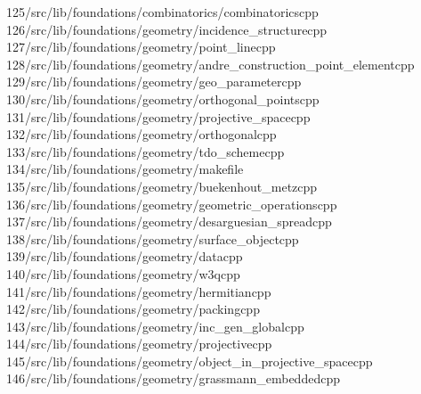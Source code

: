 \begin{tabbing}
125\>/src/lib/foundations/combinatorics/combinatoricscpp\\[0pt]
126\>/src/lib/foundations/geometry/incidence\_structurecpp\\[0pt]
127\>/src/lib/foundations/geometry/point\_linecpp\\[0pt]
128\>/src/lib/foundations/geometry/andre\_construction\_point\_elementcpp\\[0pt]
129\>/src/lib/foundations/geometry/geo\_parametercpp\\[0pt]
130\>/src/lib/foundations/geometry/orthogonal\_pointscpp\\[0pt]
131\>/src/lib/foundations/geometry/projective\_spacecpp\\[0pt]
132\>/src/lib/foundations/geometry/orthogonalcpp\\[0pt]
133\>/src/lib/foundations/geometry/tdo\_schemecpp\\[0pt]
134\>/src/lib/foundations/geometry/makefile\\[0pt]
135\>/src/lib/foundations/geometry/buekenhout\_metzcpp\\[0pt]
136\>/src/lib/foundations/geometry/geometric\_operationscpp\\[0pt]
137\>/src/lib/foundations/geometry/desarguesian\_spreadcpp\\[0pt]
138\>/src/lib/foundations/geometry/surface\_objectcpp\\[0pt]
139\>/src/lib/foundations/geometry/datacpp\\[0pt]
140\>/src/lib/foundations/geometry/w3qcpp\\[0pt]
141\>/src/lib/foundations/geometry/hermitiancpp\\[0pt]
142\>/src/lib/foundations/geometry/packingcpp\\[0pt]
143\>/src/lib/foundations/geometry/inc\_gen\_globalcpp\\[0pt]
144\>/src/lib/foundations/geometry/projectivecpp\\[0pt]
145\>/src/lib/foundations/geometry/object\_in\_projective\_spacecpp\\[0pt]
146\>/src/lib/foundations/geometry/grassmann\_embeddedcpp\\[0pt]

\end{tabbing}
